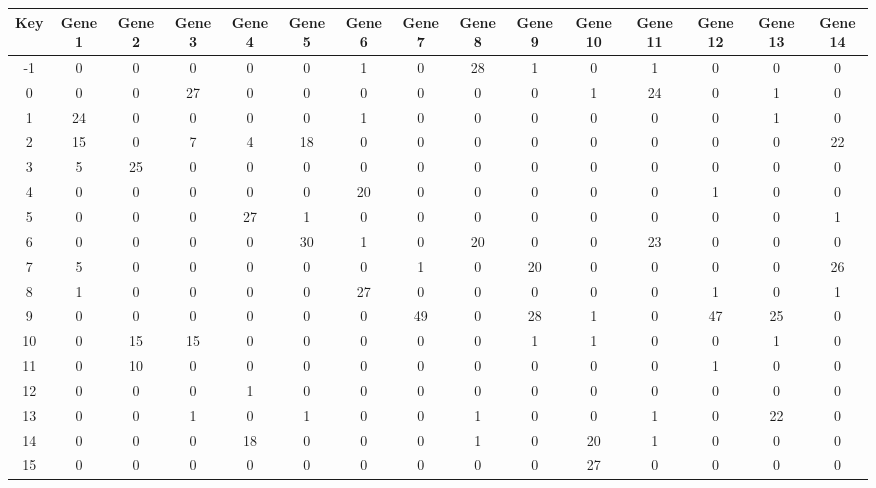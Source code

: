 \begin{tabular}{|c|c|c|c|c|c|c|c|c|c|c|c|c|c|c|}
\hline
Key & Gene 1 & Gene 2 & Gene 3 & Gene 4 & Gene 5 & Gene 6 & Gene 7 & Gene 8 & Gene 9 & Gene 10 & Gene 11 & Gene 12 & Gene 13 & Gene 14 \\
\hline
-1 & 0 & 0 & 0 & 0 & 0 & 1 & 0 & 28 & 1 & 0 & 1 & 0 & 0 & 0 \\
0 & 0 & 0 & 27 & 0 & 0 & 0 & 0 & 0 & 0 & 1 & 24 & 0 & 1 & 0 \\
1 & 24 & 0 & 0 & 0 & 0 & 1 & 0 & 0 & 0 & 0 & 0 & 0 & 1 & 0 \\
2 & 15 & 0 & 7 & 4 & 18 & 0 & 0 & 0 & 0 & 0 & 0 & 0 & 0 & 22 \\
3 & 5 & 25 & 0 & 0 & 0 & 0 & 0 & 0 & 0 & 0 & 0 & 0 & 0 & 0 \\
4 & 0 & 0 & 0 & 0 & 0 & 20 & 0 & 0 & 0 & 0 & 0 & 1 & 0 & 0 \\
5 & 0 & 0 & 0 & 27 & 1 & 0 & 0 & 0 & 0 & 0 & 0 & 0 & 0 & 1 \\
6 & 0 & 0 & 0 & 0 & 30 & 1 & 0 & 20 & 0 & 0 & 23 & 0 & 0 & 0 \\
7 & 5 & 0 & 0 & 0 & 0 & 0 & 1 & 0 & 20 & 0 & 0 & 0 & 0 & 26 \\
8 & 1 & 0 & 0 & 0 & 0 & 27 & 0 & 0 & 0 & 0 & 0 & 1 & 0 & 1 \\
9 & 0 & 0 & 0 & 0 & 0 & 0 & 49 & 0 & 28 & 1 & 0 & 47 & 25 & 0 \\
10 & 0 & 15 & 15 & 0 & 0 & 0 & 0 & 0 & 1 & 1 & 0 & 0 & 1 & 0 \\
11 & 0 & 10 & 0 & 0 & 0 & 0 & 0 & 0 & 0 & 0 & 0 & 1 & 0 & 0 \\
12 & 0 & 0 & 0 & 1 & 0 & 0 & 0 & 0 & 0 & 0 & 0 & 0 & 0 & 0 \\
13 & 0 & 0 & 1 & 0 & 1 & 0 & 0 & 1 & 0 & 0 & 1 & 0 & 22 & 0 \\
14 & 0 & 0 & 0 & 18 & 0 & 0 & 0 & 1 & 0 & 20 & 1 & 0 & 0 & 0 \\
15 & 0 & 0 & 0 & 0 & 0 & 0 & 0 & 0 & 0 & 27 & 0 & 0 & 0 & 0 \\
\hline
\end{tabular}